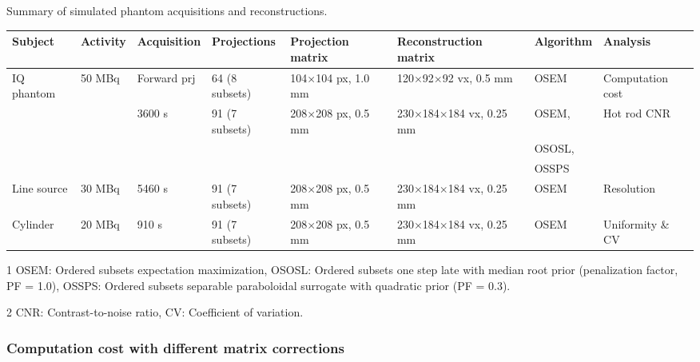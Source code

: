 \documentclass[utf8]{FrontiersinHarvard} %
\begin{document}
\begin{threeparttable}[h!]
\caption{Summary of simulated phantom acquisitions and reconstructions.\label{tab:phantom_summary}}
\footnotesize
\begin{tabular}{l l l l l l l l}
	\hline
	Subject & Activity & Acquisition & Projections & Projection matrix & Reconstruction matrix & Algorithm\footnotemark[1] & Analysis\footnotemark[2] \\ \hline
	
	IQ phantom & 50 MBq & Forward prj & 64 (8 subsets) & 104$\times$104 px, 1.0 mm & 120$\times$92$\times$92 vx, 0.5 mm & OSEM & Computation cost	\\
	 & & 3600 s & 91 (7 subsets) & 208$\times$208 px, 0.5 mm & 230$\times$184$\times$184 vx, 0.25 mm & OSEM, & Hot rod $\mathrm{CNR}$ \\
	 & & & & & & OSOSL,	\\
	 & & & & & & OSSPS	\\
	
	Line source & 30 MBq & 5460 s & 91 (7 subsets) & 208$\times$208 px, 0.5 mm & 230$\times$184$\times$184 vx, 0.25 mm & OSEM & Resolution	\\
	
	
	Cylinder & 20 MBq & 910 s & 91 (7 subsets) & 208$\times$208 px, 0.5 mm & 230$\times$184$\times$184 vx, 0.25 mm & OSEM & Uniformity \& $\mathrm{CV}$	\\ \hline
	
\end{tabular}
\begin{tablenotes}
	\item[1] OSEM: Ordered subsets expectation maximization, OSOSL: Ordered subsets one step late with median root prior (penalization factor, PF = 1.0), OSSPS: Ordered subsets separable paraboloidal surrogate with quadratic prior (PF = 0.3).%
	\item[2] $\mathrm{CNR}$: Contrast-to-noise ratio, $\mathrm{CV}$: Coefficient of variation.
\end{tablenotes}
\end{threeparttable}


\subsubsection{Computation cost with different matrix corrections}
\end{document}
